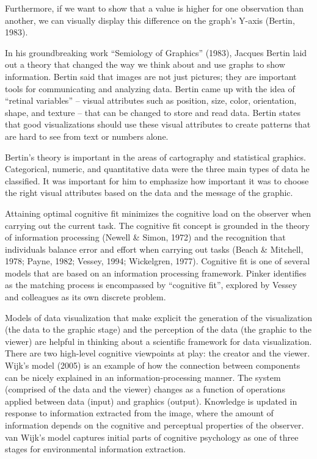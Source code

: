 \documentclass[print]{nuthesis}
\begin{document}
Furthermore, if we want to show that a value is higher for one observation than another, we can visually display this difference on the graph's Y-axis (Bertin, 1983).

In his groundbreaking work ``Semiology of Graphics'' (1983), Jacques Bertin laid out a theory that changed the way we think about and use graphs to show information.
Bertin said that images are not just pictures; they are important tools for communicating and analyzing data.
Bertin came up with the idea of ``retinal variables'' -- visual attributes such as position, size, color, orientation, shape, and texture -- that can be changed to store and read data.
Bertin states that good visualizations should use these visual attributes to create patterns that are hard to see from text or numbers alone.

Bertin's theory is important in the areas of cartography and statistical graphics.
Categorical, numeric, and quantitative data were the three main types of data he classified.
It was important for him to emphasize how important it was to choose the right visual attributes based on the data and the message of the graphic.

Attaining optimal cognitive fit minimizes the cognitive load on the observer when carrying out the current task.
The cognitive fit concept is grounded in the theory of information processing (Newell \& Simon, 1972) and the recognition that individuals balance error and effort when carrying out tasks (Beach \& Mitchell, 1978; Payne, 1982; Vessey, 1994; Wickelgren, 1977).
Cognitive fit is one of several models that are based on an information processing framework.
Pinker identifies as the matching process is encompassed by ``cognitive fit'', explored by Vessey and colleagues as its own discrete problem.

Models of data visualization that make explicit the generation of the visualization (the data to the graphic stage) and the perception of the data (the graphic to the viewer) are helpful in thinking about a scientific framework for data visualization.
There are two high-level cognitive viewpoints at play: the creator and the viewer.
Wijk's model (2005) is an example of how the connection between components can be nicely explained in an information-processing manner.
The system (comprised of the data and the viewer) changes as a function of operations applied between data (input) and graphics (output).
Knowledge is updated in response to information extracted from the image, where the amount of information depends on the cognitive and perceptual properties of the observer.
van Wijk's model captures initial parts of cognitive psychology as one of three stages for environmental information extraction.
\end{document}

